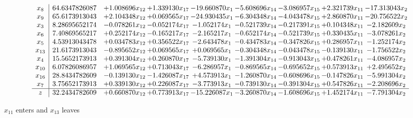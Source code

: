 \documentclass[10pt]{article}
\begin{document}
 \[\begin{array}{c| c c@{\hskip 2pt} c@{\hskip 2pt} c@{\hskip 2pt} c@{\hskip 2pt} c@{\hskip 2pt} c@{\hskip 2pt} c@{\hskip 2pt} }
 x_{8}   &  64.6347826087 & + 1.008696 x_{12} & + 1.339130 x_{17} & -19.660870 x_{1} & -5.608696 x_{14} & -3.086957 x_{15} & + 2.321739 x_{11} & -17.313043 x_{2}\\
 x_{9}   &  65.6173913043 & + 2.104348 x_{12} & + 0.069565 x_{17} & -24.930435 x_{1} & -6.304348 x_{14} & -4.043478 x_{15} & + 2.860870 x_{11} & -20.756522 x_{2}\\
 x_{3}   &  8.28695652174 & -0.078261 x_{12} & -0.052174 x_{17} & -1.052174 x_{1} & -0.521739 x_{14} & -0.217391 x_{15} & + 0.104348 x_{11} & -2.182609 x_{2}\\
 x_{6}   &  7.40869565217 & + 0.252174 x_{12} & -0.165217 x_{17} & -2.165217 x_{1} & -0.652174 x_{14} & -0.521739 x_{15} & + 0.330435 x_{11} & -3.078261 x_{2}\\
 x_{5}   &  4.53913043478 & + 0.034783 x_{12} & + 0.356522 x_{17} & -2.643478 x_{1} & -0.434783 x_{14} & -0.347826 x_{15} & + 0.286957 x_{11} & -1.252174 x_{2}\\
 x_{13}   &  21.6173913043 & -0.895652 x_{12} & + 0.069565 x_{17} & + 0.069565 x_{1} & -0.304348 x_{14} & -0.043478 x_{15} & -0.139130 x_{11} & -1.756522 x_{2}\\
 x_{4}   &  15.5652173913 & + 0.391304 x_{12} & + 0.260870 x_{17} & -5.739130 x_{1} & -1.391304 x_{14} & -0.913043 x_{15} & + 0.478261 x_{11} & -4.086957 x_{2}\\
 x_{10}   &  6.07826086957 & + 1.069565 x_{12} & + 0.713043 x_{17} & -6.286957 x_{1} & -0.869565 x_{14} & -0.695652 x_{15} & + 0.573913 x_{11} & + 2.495652 x_{2}\\
 x_{16}   &  28.8434782609 & -0.139130 x_{12} & -1.426087 x_{17} & + 4.573913 x_{1} & -1.260870 x_{14} & -0.608696 x_{15} & -0.147826 x_{11} & -5.991304 x_{2}\\
 x_{7}   &  3.75652173913 & + 0.339130 x_{12} & + 0.226087 x_{17} & -3.773913 x_{1} & -0.739130 x_{14} & -0.391304 x_{15} & + 0.547826 x_{11} & -2.208696 x_{2}\\
\hline
z    &  32.2434782609 & + 0.660870 x_{12} & + 0.773913 x_{17} & -15.226087 x_{1} & -3.260870 x_{14} & -1.608696 x_{15} & + 1.452174 x_{11} & -7.791304 x_{2}\\
\end{array}\]


 $ x_{11} $ enters and $ x_{13} $ leaves 
\end{document}
